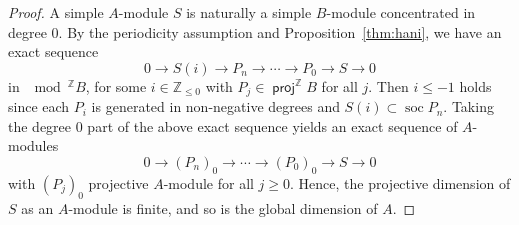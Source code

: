\documentclass[a4paper,reqno,11pt]{amsart}
\theoremstyle{definition}
\newcommand{\Z}{\mathbb{Z}}
\newcommand{\soc}{\operatorname{soc}\nolimits}
\newcommand{\rad}{\operatorname{rad}\nolimits}
\DeclareMathOperator{\proj}{\mathsf{proj}}
\newcommand{\new}[1]{{\blue #1}}
\newcommand{\old}[1]{{\red #1}}
\numberwithin{equation}{section}
\begin{document}
\begin{proof}
A simple $A$-module $S$ is naturally a simple $B$-module concentrated in degree $0$.  By the periodicity assumption and Proposition~\ref{thm:hani}, we have an exact sequence
\[
0 \to S(i) \to P_n \to \cdots \to P_0 \rightarrow S\to 0
\]
in $\mod^{\Z}B$,
for some $i\in \Z_{\leq 0}$ with $P_j\in \proj^\Z B$ for all $j$.
\new{Then $i\le -1$ holds since each $P_i$ is generated in non-negative degrees and $S(i)\subset\soc P_n$.}
Taking the degree $0$ part of the above exact sequence yields an exact sequence of $A$-modules
\[
0 \to (P_n)_0 \to \cdots \to (P_0)_0 \rightarrow S\to 0
\]
with $(P_j)_0$ projective $A$-module for all $j\geq 0$. Hence, the projective dimension of $S$ as an $A$-module is finite, and so is the global dimension of $A$.
\end{proof}
\end{document}
